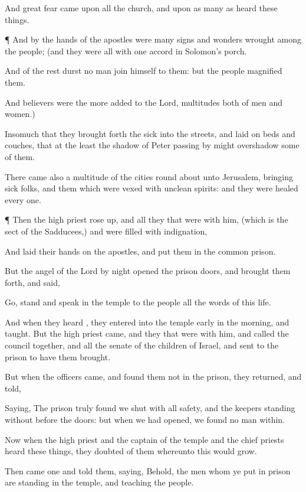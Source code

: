 {And
great
fear
came
upon
all the
church,
and
upon as many
as
heard these
things.


\par }{\PP {}¶
And
by the
hands of the
apostles
were
many
signs
and
wonders wrought
among the
people; (and they
were
all with one
accord
in
Solomon’s
porch.

And of the
rest
durst no
man join
himself to
them:
but the
people
magnified
them.

And
believers
were the
more
added to the
Lord,
multitudes
both of
men
and
women.)

Insomuch
that they brought
forth the
sick into the
streets,
and
laid
{}
on
beds
and
couches,
that at the
least the
shadow of
Peter passing
by might
overshadow
some of
them.

There
came
also a
multitude
{} of the
cities round
about
unto
Jerusalem,
bringing sick
folks,
and
them
which were
vexed
with
unclean
spirits: and they were
healed every
one.


\par }{\PP {}¶
Then the high
priest rose
up,
and
all they that
were
with
him, (which
is the
sect of the
Sadducees,) and were
filled with
indignation,

And
laid
their
hands
on the
apostles,
and
put
them
in the
common
prison.

But the
angel of the
Lord
by
night
opened the
prison
doors,
and
brought
them
forth, and
said,

Go,
stand
and
speak
in the
temple to the
people
all the
words
of
this
life.

And when they
heard
{}, they
entered
into the
temple early in the
morning,
and
taught.
But the high
priest
came,
and they that
were
with
him,
and
called the
council
together,
and
all the
senate of the
children of
Israel,
and
sent
to the
prison to
have
them
brought.

But
when the
officers
came,
and
found
them
not
in the
prison, they
returned,
and
told,

Saying, The
prison
truly found
we
shut
with
all
safety,
and the
keepers
standing
without
before the
doors:
but when we had
opened, we
found no
man
within.

Now
when the high
priest
and the
captain of the
temple
and the chief
priests
heard
these
things, they
doubted
of
them
whereunto
this would
grow.

Then
came
one
and
told
them,
saying,
Behold, the
men
whom ye
put
in
prison
are
standing
in the
temple,
and
teaching the
people.

}
